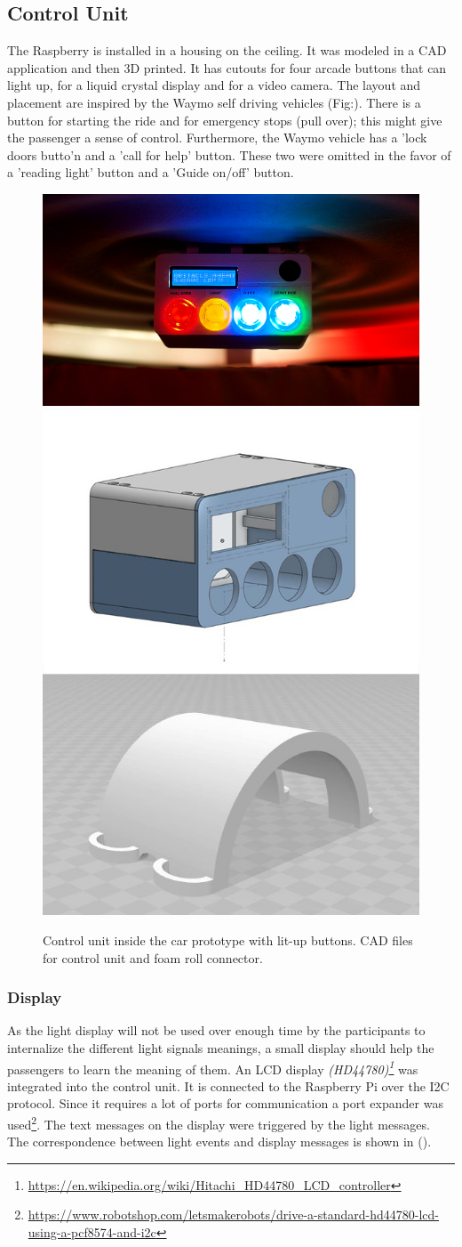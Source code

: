 \subsection{Control Unit}
\label{ssec:controlunit}
The Raspberry is installed in a housing on the ceiling. It was modeled in a CAD application and then 3D printed. It has cutouts for four arcade buttons that can light up, for a liquid crystal display and for a video camera. The layout and placement are inspired by the Waymo self driving vehicles (Fig:\emph{}). There is a button for starting the ride and for emergency stops (pull over); this might give the passenger a sense of control. Furthermore, the Waymo vehicle has a 'lock doors butto'n and a 'call for help' button. These two were omitted in the favor of a 'reading light' button and a 'Guide on/off' button. 

\begin{figure}
\includegraphics[height=0.38\textwidth]{fig/monitor.png}\hfill\includegraphics[height=0.38\textwidth]{fig/boxes.jpg}
\caption[Control Unit]{Control unit inside the car prototype with lit-up buttons. CAD files for control unit and foam roll connector.}
\label{fig:boxes}
\end{figure}

\subsubsection{Display}
\label{ssec:display}
As the light display will not be used over enough time by the participants to internalize the different light signals meanings, a small display should help the passengers to learn the meaning of them. An LCD display \emph{(HD44780)\footnote{\url{https://en.wikipedia.org/wiki/Hitachi_HD44780_LCD_controller}}} was integrated into the control unit. It is connected to the Raspberry Pi over the I2C protocol. Since it requires a lot of ports for communication 
a port expander was used\footnote{\url{https://www.robotshop.com/letsmakerobots/drive-a-standard-hd44780-lcd-using-a-pcf8574-and-i2c}}. The text messages on the display were triggered by the light messages. The correspondence between light events and display messages is shown in (\emph{}).

